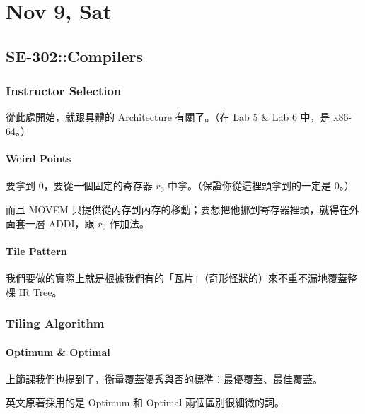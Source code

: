 \documentclass[
]{article}
\date{}
\begin{document}
\hypertarget{header-n0}{%
\section{Nov 9, Sat}\label{header-n0}}

\hypertarget{header-n2}{%
\subsection{SE-302::Compilers}\label{header-n2}}

\hypertarget{header-n3}{%
\subsubsection{Instructor Selection}\label{header-n3}}

從此處開始，就跟具體的 Architecture 有關了。（在 Lab 5 \& Lab 6 中，是
x86-64。）

\hypertarget{header-n5}{%
\paragraph{Weird Points}\label{header-n5}}

要拿到 0，要從一個固定的寄存器 \(r_0\)
中拿。（保證你從這裡頭拿到的一定是 0。）

而且 MOVEM
只提供從內存到內存的移動；要想把他挪到寄存器裡頭，就得在外面套一層
ADDI，跟 \(r_0\) 作加法。

\hypertarget{header-n8}{%
\paragraph{Tile Pattern}\label{header-n8}}

我們要做的實際上就是根據我們有的「瓦片」（奇形怪狀的）來不重不漏地覆蓋整棵
IR Tree。

\hypertarget{header-n10}{%
\subsubsection{Tiling Algorithm}\label{header-n10}}

\hypertarget{header-n11}{%
\paragraph{Optimum \& Optimal}\label{header-n11}}

上節課我們也提到了，衡量覆蓋優秀與否的標準：最優覆蓋、最佳覆蓋。

英文原著採用的是 Optimum 和 Optimal 兩個區別很細微的詞。
\end{document}
